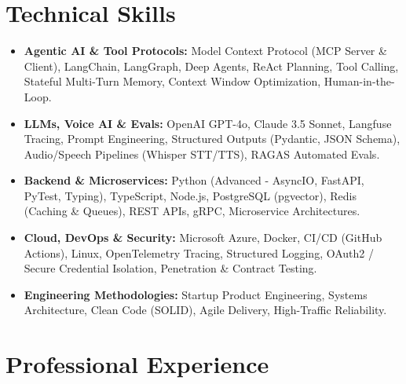 \documentclass[a4paper,10pt]{article}
\begin{document}
\section{Technical Skills}
\begin{itemize}[leftmargin=1.2em, itemsep=2pt]
  \item \textbf{Agentic AI \& Tool Protocols:} Model Context Protocol (MCP Server \& Client), LangChain, LangGraph, Deep Agents, ReAct Planning, Tool Calling, Stateful Multi-Turn Memory, Context Window Optimization, Human-in-the-Loop.
  \item \textbf{LLMs, Voice AI \& Evals:} OpenAI GPT-4o, Claude 3.5 Sonnet, Langfuse Tracing, Prompt Engineering, Structured Outputs (Pydantic, JSON Schema), Audio/Speech Pipelines (Whisper STT/TTS), RAGAS Automated Evals.
  \item \textbf{Backend \& Microservices:} Python (Advanced - AsyncIO, FastAPI, PyTest, Typing), TypeScript, Node.js, PostgreSQL (pgvector), Redis (Caching \& Queues), REST APIs, gRPC, Microservice Architectures.
  \item \textbf{Cloud, DevOps \& Security:} Microsoft Azure, Docker, CI/CD (GitHub Actions), Linux, OpenTelemetry Tracing, Structured Logging, OAuth2 / Secure Credential Isolation, Penetration \& Contract Testing.
  \item \textbf{Engineering Methodologies:} Startup Product Engineering, Systems Architecture, Clean Code (SOLID), Agile Delivery, High-Traffic Reliability.
\end{itemize}

\section{Professional Experience}
\end{document}
